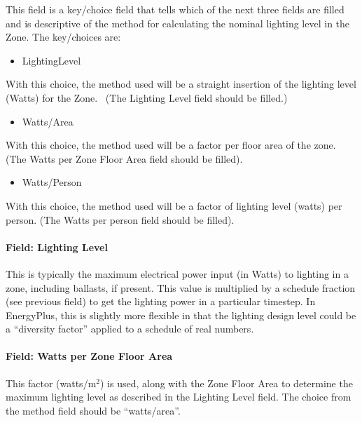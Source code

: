 This field is a key/choice field that tells which of the next three fields are filled and is descriptive of the method for calculating the nominal lighting level in the Zone. The key/choices are:

\begin{itemize}
\tightlist
\item
  LightingLevel
\end{itemize}

With this choice, the method used will be a straight insertion of the lighting level (Watts) for the Zone.~ (The Lighting Level field should be filled.)

\begin{itemize}
\tightlist
\item
  Watts/Area
\end{itemize}

With this choice, the method used will be a factor per floor area of the zone. (The Watts per Zone Floor Area field should be filled).

\begin{itemize}
\tightlist
\item
  Watts/Person
\end{itemize}

With this choice, the method used will be a factor of lighting level (watts) per person. (The Watts per person field should be filled).

\paragraph{Field: Lighting Level}\label{field-lighting-level}

This is typically the maximum electrical power input (in Watts) to lighting in a zone, including ballasts, if present. This value is multiplied by a schedule fraction (see previous field) to get the lighting power in a particular timestep. In EnergyPlus, this is slightly more flexible in that the lighting design level could be a ``diversity factor'' applied to a schedule of real numbers.

\paragraph{Field: Watts per Zone Floor Area}\label{field-watts-per-zone-floor-area}

This factor (watts/m\(^{2}\)) is used, along with the Zone Floor Area to determine the maximum lighting level as described in the Lighting Level field. The choice from the method field should be ``watts/area''.


